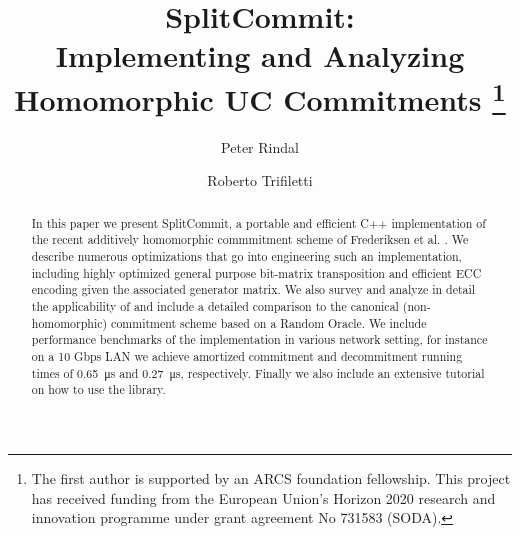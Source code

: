 \documentclass[letterpaper]{llncs}
\begin{document}
	
	\title{SplitCommit:\\ Implementing and Analyzing Homomorphic UC Commitments%
	\thanks{The first author is supported by an ARCS foundation fellowship. This project has received funding from the European Union's Horizon 2020 research and innovation programme under grant agreement No 731583 (SODA).}}
	
	
	\author{
		Peter Rindal \and Roberto Trifiletti
		}

	\date{}

	\maketitle
	

	
	\begin{abstract}
	In this paper we present SplitCommit, a portable and efficient C++ implementation of the recent additively homomorphic commmitment scheme of Frederiksen et al. \cite{DBLP:conf/tcc/FrederiksenJNT16}. We describe numerous optimizations that go into engineering such an implementation, including highly optimized general purpose bit-matrix transposition and efficient ECC encoding given the associated generator matrix. We also survey and analyze in detail the applicability of \cite{DBLP:conf/tcc/FrederiksenJNT16} and include a detailed comparison to the canonical (non-homomorphic) commitment scheme based on a Random Oracle. We include performance benchmarks of the implementation in various network setting, for instance on a 10 Gbps LAN we achieve amortized commitment and decommitment running times of \SI{0.65}{\micro\second} and \SI{0.27}{\micro\second}, respectively. Finally we also include an extensive tutorial on how to use the library.

	\end{abstract}
	
	
	\pagestyle{plain}
	
	
	
	
	

	
	
	
	
	
	
	
	
	
	
\end{document}
